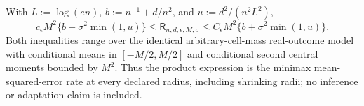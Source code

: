 With \(L:=\log(en)\), \(b:=n^{-1}+d/n^2\), and \(u:=d^2/(n^2L^2)\),
\[
 c_{\epsilon}M^2\{b+\sigma^2\min(1,u)\}
 \le\mathsf R_{n,d,\epsilon,M,\sigma}
 \le C_{\epsilon}M^2\{b+\sigma^2\min(1,u)\}.
\]
Both inequalities range over the identical arbitrary-cell-mass real-outcome model with conditional means in \([-M/2,M/2]\) and conditional second central moments bounded by \(M^2\).  Thus the product expression is the minimax mean-squared-error rate at every declared radius, including shrinking radii; no inference or adaptation claim is included.